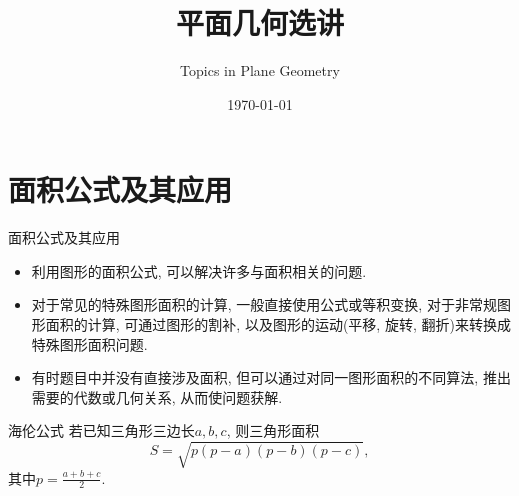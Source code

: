 \documentclass[aspectratio=169]{ctexbeamer}
\title[平面几何选讲]{平面几何选讲}
\subtitle{Topics in Plane Geometry}
\author[]{\kaishu{}}
\date[\today]{\today}
\begin{document}
\frame{\titlepage}
{}
\section{面积公式及其应用}
\begin{frame}{面积公式及其应用}
	\begin{itemize}
		\item 利用图形的面积公式, 可以解决许多与面积相关的问题.
		\item 对于常见的特殊图形面积的计算, 一般直接使用公式或等积变换, 对于非常规图形面积的计算, 可通过图形的割补, 以及图形的运动(平移, 旋转, 翻折)来转换成特殊图形面积问题.
		\item 有时题目中并没有直接涉及面积, 但可以通过对同一图形面积的不同算法, 推出需要的代数或几何关系, 从而使问题获解.
	\end{itemize}
	\pause
	\begin{alertblock}{海伦公式}
		若已知三角形三边长$a, b, c$, 则三角形面积
		$$
			S=\sqrt{p(p-a)(p-b)(p-c)},
		$$其中$p=\frac{a+b+c}{2}$.
	\end{alertblock}
\end{frame}
\end{document}
